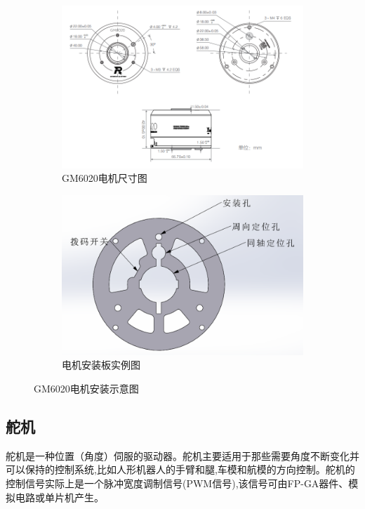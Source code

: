 \documentclass[UTF8]{article} %
\begin{document}
\begin{figure}[H]
  \centering
  \begin{subfigure}[b]{0.4\textwidth}
         \centering
         \includegraphics[width=\textwidth]{an1.png}
          \caption{GM6020电机尺寸图}
  \end{subfigure}
  \quad
  \begin{subfigure}[b]{0.4\textwidth}
          \centering
          \includegraphics[width=\textwidth]{an2.png}
          \caption{电机安装板实例图}
  \end{subfigure}
  \caption{GM6020电机安装示意图}
\end{figure}


\subsection{舵机}

舵机是一种位置（角度）伺服的驱动器。舵机主要适用于那些需要角度不断变化并可以保持的控制系统,比如人形机器人的手臂和腿,车模和航模的方向控制。舵机的控制信号实际上是一个脉冲宽度调制信号(PWM信号),该信号可由FP-GA器件、模拟电路或单片机产生。
\end{document}
